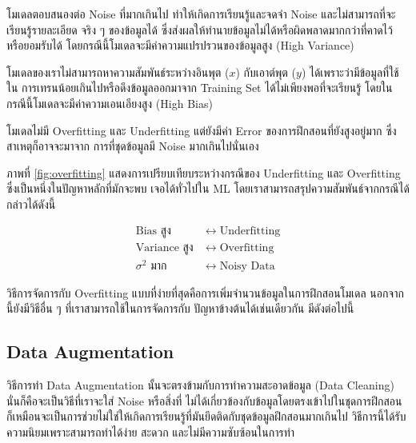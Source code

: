 \begin{description}[style=nextline]
    \item[Overfitting] โมเดลตอบสนองต่อ Noise ที่มากเกินไป ทำให้เกิดการเรียนรู้และจดจำ Noise และไม่สามารถที่จะเรียนรู้รายละเอียด%
    จริง ๆ ของข้อมูลได้ ซึ่งส่งผลให้ทำนายข้อมูลไม่ได้หรือผิดพลาดมากกว่าที่คาดไว้หรือยอมรับได้ โดยกรณีนี้โมเดลจะมีค่าความแปรปรวนของข้อมูลสูง 
    (High Variance)
    
    \item[Underfitting] โมเดลของเราไม่สามารถหาความสัมพันธ์ระหว่างอินพุต ($x$) กับเอาต์พุต ($y$) ได้เพราะว่ามีข้อมูลที่ใช้ใน%
    การเทรนน้อยเกินไปหรือดึงข้อมูลออกมาจาก Training Set ได้ไม่เพียงพอที่จะเรียนรู้ โดยในกรณีนี้โมเดลจะมีค่าความเอนเอียงสูง (High Bias)

    \item[Noisy] โมเดลไม่มี Overfitting และ Underfitting แต่ยังมีค่า Error ของการฝึกสอนที่ยังสูงอยู่มาก ซึ่งสาเหตุก็อาจจะมาจาก%
    การที่ชุดข้อมูลมี Noise มากเกินไปนั่นเอง
\end{description}

ภาพที่ \ref{fig:overfitting} แสดงการเปรียบเทียบระหว่างกรณีของ Underfitting และ Overfitting ซึ่งเป็นหนึ่งในปัญหาหลักที่มักจะพบ%
เจอได้ทั่วไปใน ML โดยเราสามารถสรุปความสัมพันธ์จากกรณีได้กล่าวได้ดังนี้

\begin{align*}
    \text{Bias สูง} &\;\longleftrightarrow\; \text{Underfitting}\\
    \text{Variance สูง} &\;\longleftrightarrow\; \text{Overfitting}\\
    \text{$\sigma^2$ มาก} &\;\longleftrightarrow\; \text{Noisy Data}
\end{align*}

วิธีการจัดการกับ Overfitting แบบที่ง่ายที่สุดคือการเพิ่มจำนวนข้อมูลในการฝึกสอนโมเดล นอกจากนี้ยังมีวิธีอื่น ๆ ที่เราสามารถใช้ในการจัดการกับ%
ปัญหาข้างต้นได้เช่นเดียวกัน มีดังต่อไปนี้

\subsection{Data Augmentation}
\label{ssec:data_aug}

วิธีการทำ Data Augmentation นั้นจะตรงข้ามกับการทำความสะอาดข้อมูล (Data Cleaning) นั่นก็คือจะเป็นวิธีที่เราจะใส่ Noise หรือสิ่งที่%
ไม่ได้เกี่ยวข้องกับข้อมูลโดยตรงเข้าไปในชุดการฝึกสอน ก็เหมือนจะเป็นการช่วยไม่ใช่ให้เกิดการเรียนรู้ที่มันยึดติดกับชุดข้อมูลฝึกสอนมากเกินไป
วิธีการนี้ได้รับความนิยมเพราะสามารถทำได้ง่าย สะดวก และไม่มีความซับซ้อนในการทำ

